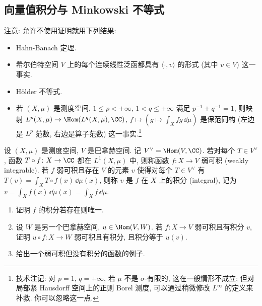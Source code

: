 \subsection{向量值积分与 Minkowski 不等式}

注意: 允许不使用证明就用下列结果:
\begin{itemize}
\item Hahn-Banach 定理.
\item 希尔伯特空间 $V$ 上的每个连续线性泛函都具有 $\langle \cdot, v \rangle$ 的形式 (其中 $v \in V$) 这一事实.
\item H\"older 不等式.
\item 若 $(X, \mu)$ 是测度空间, $1 \leq p < +\infty$, $1 < q \leq +\infty$ 满足 $p^{-1} + q^{-1} = 1$, 则映射 $L^p(X, \mu) \to \Hom(L^q(X, \mu), \CC)$, $f \longmapsto (g \longmapsto \int_X fg\,\dd\mu)$ 是保范同构 (左边是 $L^p$ 范数, 右边是算子范数) 这一事实.\footnote{技术注记: 对 $p = 1$, $q = +\infty$, 若 $\mu$ 不是 $\sigma$-有限的, 这在一般情形不成立; 但对局部紧 Hausdorff 空间上的正则 Borel 测度, 可以通过稍微修改 $L^{\infty}$ 的定义来补救. 你可以忽略这一点.}
\end{itemize}

\begin{exercise}[弱可积函数与积分]
\label{ex:I.5.6.1}
设 $(X, \mu)$ 是测度空间, $V$ 是巴拿赫空间. 记 $V^{\vee} = \Hom(V, \CC)$. 若对每个 $T \in V^{\vee}$, 函数 $T \circ f \colon X \to \CC$ 都在 $L^1(X, \mu)$ 中, 则称函数 $f \colon X \to V$ 弱可积 (weakly integrable). 若 $f$ 弱可积且存在 $V$ 的元素 $v$ 使得对每个 $T \in V^{\vee}$ 有 $T(v) = \int_X T \circ f(x)\,\dd\mu(x)$, 则称 $v$ 是 $f$ 在 $X$ 上的积分 (integral), 记为 $v = \int_X f(x)\,\dd\mu(x) = \int_X f\,\dd\mu$.
\begin{enumerate}
\item[(a)] 证明 $f$ 的积分若存在则唯一.
\item[(b)] 设 $W$ 是另一个巴拿赫空间, $u \in \Hom(V, W)$. 若 $f \colon X \to V$ 弱可积且有积分 $v$, 证明 $u \circ f \colon X \to W$ 弱可积且有积分, 且积分等于 $u(v)$.
\item[(c)] 给出一个弱可积但没有积分的函数的例子.
\end{enumerate}
\end{exercise}

